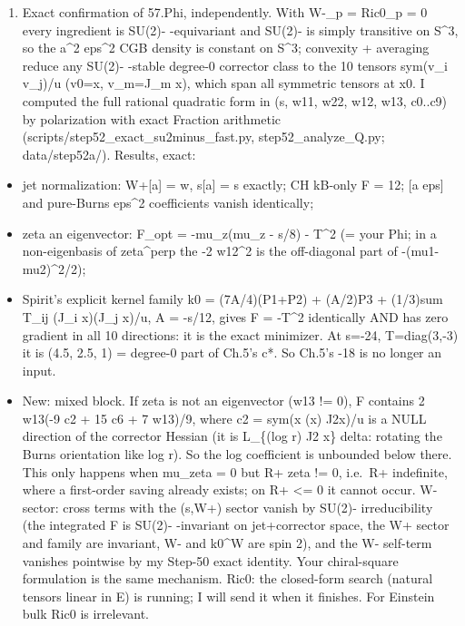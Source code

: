 \documentclass[
  10pt,
]{report}
\providecommand{\tightlist}{%
  \setlength{\itemsep}{0pt}\setlength{\parskip}{0pt}}
\begin{document}
\begin{enumerate}
\def\labelenumi{\arabic{enumi}.}
\tightlist
\item
  Exact confirmation of 57.Phi, independently. With W-\_p = Ric0\_p = 0
  every ingredient is SU(2)- -equivariant and SU(2)- is simply
  transitive on S\^{}3, so the a\^{}2 eps\^{}2 CGB density is constant
  on S\^{}3; convexity + averaging reduce any SU(2)- -stable degree-0
  corrector class to the 10 tensors sym(v\_i v\_j)/u (v0=x, v\_m=J\_m
  x), which span all symmetric tensors at x0. I computed the full
  rational quadratic form in (s, w11, w22, w12, w13, c0..c9) by
  polarization with exact Fraction arithmetic
  (scripts/step52\_exact\_su2minus\_fast.py, step52\_analyze\_Q.py;
  data/step52a/). Results, exact:
\end{enumerate}

\begin{itemize}
\tightlist
\item
  jet normalization: W+{[}a{]} = w, s{[}a{]} = s exactly; CH kB-only F =
  12; {[}a eps{]} and pure-Burns eps\^{}2 coefficients vanish
  identically;
\item
  zeta an eigenvector: F\_opt = -mu\_z(mu\_z - s/8) -
  \textbar T\textbar\^{}2 (= your Phi; in a non-eigenbasis of
  zeta\^{}perp the -2 w12\^{}2 is the off-diagonal part of
  -(mu1-mu2)\^{}2/2);
\item
  Spirit's explicit kernel family k0 = (7A/4)(P1+P2) + (A/2)P3 +
  (1/3)sum T\_ij (J\_i x)(J\_j x)/u, A = -s/12, gives F =
  -\textbar T\textbar\^{}2 identically AND has zero gradient in all 10
  directions: it is the exact minimizer. At s=-24, T=diag(3,-3) it is
  (4.5, 2.5, 1) = degree-0 part of Ch.5's c*. So Ch.5's -18 is no longer
  an input.
\item
  New: mixed block. If zeta is not an eigenvector (w13 != 0), F contains
  2 w13(-9 c2 + 15 c6 + 7 w13)/9, where c2 = sym(x (x) J2x)/u is a NULL
  direction of the corrector Hessian (it is L\_\{(log r) J2 x\} delta:
  rotating the Burns orientation like log r). So the log coefficient is
  unbounded below there. This only happens when mu\_zeta = 0 but R+ zeta
  != 0, i.e.~R+ indefinite, where a first-order saving already exists;
  on R+ \textless= 0 it cannot occur. W- sector: cross terms with the
  (s,W+) sector vanish by SU(2)- irreducibility (the integrated F is
  SU(2)- -invariant on jet+corrector space, the W+ sector and family are
  invariant, W- and k0\^{}W are spin 2), and the W- self-term vanishes
  pointwise by my Step-50 exact identity. Your chiral-square formulation
  is the same mechanism. Ric0: the closed-form search (natural tensors
  linear in E) is running; I will send it when it finishes. For Einstein
  bulk Ric0 is irrelevant.
\end{itemize}
\end{document}
